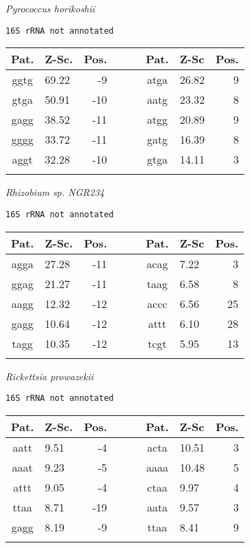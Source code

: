 \vspace{1em}
\noindent
{\it Pyrococcus horikoshii    }
\begin{verbatim}
16S rRNA not annotated
\end{verbatim}

\noindent
\begin{center}
\begin{tabular}{clrcclr}
Pat. & Z-Sc. & Pos. & \verb+   + & Pat. & Z-Sc & Pos. \\
\hline
ggtg & 69.22 & -9 &  & atga & 26.82 & 9 \\
gtga & 50.91 & -10 &  & aatg & 23.32 & 8 \\
gagg & 38.52 & -11 &  & atgg & 20.89 & 9 \\
gggg & 33.72 & -11 &  & gatg & 16.39 & 8 \\
aggt & 32.28 & -10 &  & gtga & 14.11 & 3 \\
    &     \\
\end{tabular}
\end{center}

\vspace{1em}
\noindent
{\it Rhizobium sp. NGR234   }
\begin{verbatim}
16S rRNA not annotated
\end{verbatim}

\noindent
\begin{center}
\begin{tabular}{clrcclr}
Pat. & Z-Sc. & Pos. & \verb+   + & Pat. & Z-Sc & Pos. \\
\hline
agga & 27.28 & -11 &  & acag & 7.22 & 3 \\
ggag & 21.27 & -11 &  & taag & 6.58 & 8 \\
aagg & 12.32 & -12 &  & accc & 6.56 & 25 \\
gagg & 10.64 & -12 &  & attt & 6.10 & 28 \\
tagg & 10.35 & -12 &  & tcgt & 5.95 & 13 \\
    &     \\
\end{tabular}
\end{center}

\vspace{1em}
\noindent
{\it Rickettsia prowazekii    }
\begin{verbatim}
16S rRNA not annotated
\end{verbatim}

\noindent
\begin{center}
\begin{tabular}{clrcclr}
Pat. & Z-Sc. & Pos. & \verb+   + & Pat. & Z-Sc & Pos. \\
\hline
aatt & 9.51 & -4 &  & acta & 10.51 & 3 \\
aaat & 9.23 & -5 &  & aaaa & 10.48 & 5 \\
attt & 9.05 & -4 &  & ctaa & 9.97 & 4 \\
ttaa & 8.71 & -19 &  & aata & 9.57 & 3 \\
gagg & 8.19 & -9 &  & ttaa & 8.41 & 9 \\
    &     \\
\end{tabular}
\end{center}

